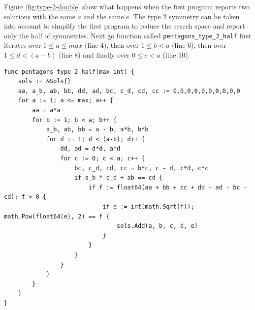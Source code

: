 \documentclass[11pt]{article}
\begin{document}
Figure \ref{fig:type-2-double} show what happens when the first program reports
two solutions with the same $a$ and the same $e$. 
The type 2 symmetry can be taken into account to simplify the first program
to reduce the search space and report only the half of symmetries.
Next go function called \texttt{pentagons\_type\_2\_half} first iterates
over $1 \leq a \leq max$ (line 4),
then over $1 \leq b < a$ (line 6),
then over $1 \leq d < (a-b)$ (line 8)
and finally over $0 \leq c < a$ (line 10).

\begin{lstlisting}
func pentagons_type_2_half(max int) {
	sols := &Sols{}
	aa, a_b, ab, bb, dd, ad, bc, c_d, cd, cc := 0,0,0,0,0,0,0,0,0,0
	for a := 1; a <= max; a++ {
		aa = a*a
		for b := 1; b < a; b++ {
			a_b, ab, bb = a - b, a*b, b*b
			for d := 1; d < (a-b); d++ {
				dd, ad = d*d, a*d
				for c := 0; c < a; c++ {
					bc, c_d, cd, cc = b*c, c - d, c*d, c*c
					if a_b * c_d + ab == cd {
						if f := float64(aa + bb + cc + dd - ad - bc - cd); f > 0 {
							if e := int(math.Sqrt(f)); math.Pow(float64(e), 2) == f {
								sols.Add(a, b, c, d, e)
							}
						}
					}
				}
			}
		}
	}
}
\end{lstlisting}
\end{document}
